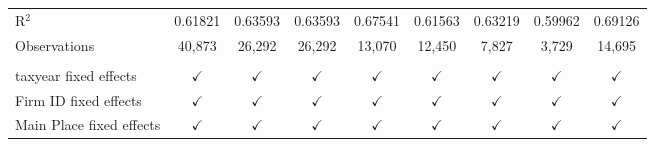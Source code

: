\begin{tabular}{lcccccccc}
    \\
   R$^2$                                   & 0.61821       & 0.63593        & 0.63593        & 0.67541        & 0.61563        & 0.63219       & 0.59962       & 0.69126\\  
   Observations                            & 40,873        & 26,292         & 26,292         & 13,070         & 12,450         & 7,827         & 3,729         & 14,695\\  
    \\
   taxyear fixed effects                   & $\checkmark$  & $\checkmark$   & $\checkmark$   & $\checkmark$   & $\checkmark$   & $\checkmark$  & $\checkmark$  & $\checkmark$\\   
   Firm ID fixed effects                   & $\checkmark$  & $\checkmark$   & $\checkmark$   & $\checkmark$   & $\checkmark$   & $\checkmark$  & $\checkmark$  & $\checkmark$\\   
   Main Place fixed effects                & $\checkmark$  & $\checkmark$   & $\checkmark$   & $\checkmark$   & $\checkmark$   & $\checkmark$  & $\checkmark$  & $\checkmark$\\   
   \bottomrule
\end{tabular}
\par\endgroup
